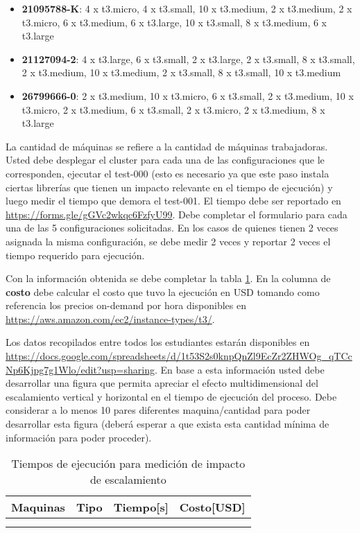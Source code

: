 \documentclass[12pt,letterpaper,twoside]{article}
\begin{document}
{\begin{itemize}
        \item \textbf{21095788-K}: 4 x t3.micro, 4 x t3.small, 10 x t3.medium, 2 x t3.medium, 2 x t3.micro, 6 x t3.medium, 6 x t3.large, 10 x t3.small, 8 x t3.medium, 6 x t3.large
        \item \textbf{21127094-2}: 4 x t3.large, 6 x t3.small, 2 x t3.large, 2 x t3.small, 8 x t3.small, 2 x t3.medium, 10 x t3.medium, 2 x t3.small, 8 x t3.small, 10 x t3.medium
        \item \textbf{26799666-0}: 2 x t3.medium, 10 x t3.micro, 6 x t3.small, 2 x t3.medium, 10 x t3.micro, 2 x t3.medium, 6 x t3.small, 2 x t3.micro, 2 x t3.medium, 8 x t3.large
    \end{itemize}

    La cantidad de máquinas se refiere a la cantidad de máquinas trabajadoras. Usted debe desplegar el cluster para cada una de las configuraciones que le corresponden, ejecutar el test-000 (esto es necesario ya que este paso instala ciertas librerías que tienen un impacto relevante en el tiempo de ejecución) y luego medir el tiempo que demora el test-001. El tiempo debe ser reportado en \url{https://forms.gle/gGVc2wkqc6FzfyU99}. Debe completar el formulario para cada una de las 5 configuraciones solicitadas. En los casos de quienes tienen 2 veces asignada la misma configuración, se debe medir 2 veces y reportar 2 veces el tiempo requerido para ejecución.

    Con la información obtenida se debe completar la tabla \ref{table:002}. En la columna de \textbf{costo} debe calcular el costo que tuvo la ejecución en USD tomando como referencia los precios on-demand por hora disponibles en \url{https://aws.amazon.com/ec2/instance-types/t3/}.

    Los datos recopilados entre todos los estudiantes estarán disponibles en \url{https://docs.google.com/spreadsheets/d/1t53S2s0knpQnZl9EcZr2ZHWOg_qTCcNp6Kjpg7g1Wlo/edit?usp=sharing}. En base a esta información usted debe desarrollar una figura que permita apreciar el efecto multidimensional del escalamiento vertical y horizontal en el tiempo de ejecución del proceso. Debe considerar a lo menos 10 pares diferentes maquina/cantidad para poder desarrollar esta figura (deberá esperar a que exista esta cantidad mínima de información para poder proceder).
}
    \begin{table}
        \centering
        \begin{tabular}{|c|c|c|c|}
            \hline
            Maquinas & Tipo & Tiempo[s] & Costo[USD] \\
            \hline
            \hline
                     &      &           &            \\
            \hline
                     &      &           &            \\
            \hline
        \end{tabular}
        \caption{Tiempos de ejecución para medición de impacto de escalamiento}
        \label{table:002}
    \end{table}
\end{document}
